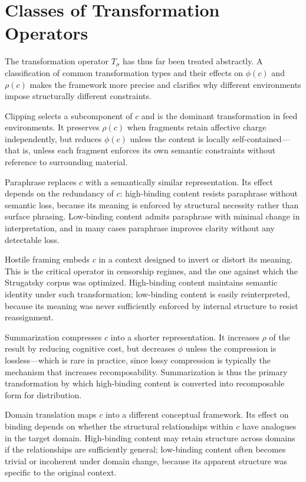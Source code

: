 \documentclass[12pt]{article}
\newcommand{\bind}{\phi}
\newcommand{\recomp}{\rho}
\begin{document}
\section{Classes of Transformation Operators}
\label{sec:transformations}

The transformation operator $T_\sigma$ has thus far been treated
abstractly. A classification of common transformation types and their
effects on $\bind(c)$ and $\recomp(c)$ makes the framework more precise
and clarifies why different environments impose structurally different
constraints.

Clipping selects a subcomponent of $c$ and is the dominant
transformation in feed environments. It preserves $\recomp(c)$ when
fragments retain affective charge independently, but reduces $\bind(c)$
unless the content is locally self-contained---that is, unless each
fragment enforces its own semantic constraints without reference to
surrounding material.

Paraphrase replaces $c$ with a semantically similar representation.
Its effect depends on the redundancy of $c$: high-binding content
resists paraphrase without semantic loss, because its meaning is
enforced by structural necessity rather than surface phrasing.
Low-binding content admits paraphrase with minimal change in
interpretation, and in many cases paraphrase improves clarity without
any detectable loss.

Hostile framing embeds $c$ in a context designed to invert or distort
its meaning. This is the critical operator in censorship regimes, and
the one against which the Strugatsky corpus was optimized. High-binding
content maintains semantic identity under such transformation; low-binding
content is easily reinterpreted, because its meaning was never
sufficiently enforced by internal structure to resist reassignment.

Summarization compresses $c$ into a shorter representation. It increases
$\recomp$ of the result by reducing cognitive cost, but decreases
$\bind$ unless the compression is lossless---which is rare in practice,
since lossy compression is typically the mechanism that increases
recomposability. Summarization is thus the primary transformation by
which high-binding content is converted into recomposable form for
distribution.

Domain translation maps $c$ into a different conceptual framework. Its
effect on binding depends on whether the structural relationships within
$c$ have analogues in the target domain. High-binding content may retain
structure across domains if the relationships are sufficiently general;
low-binding content often becomes trivial or incoherent under domain
change, because its apparent structure was specific to the original
context.
\end{document}
